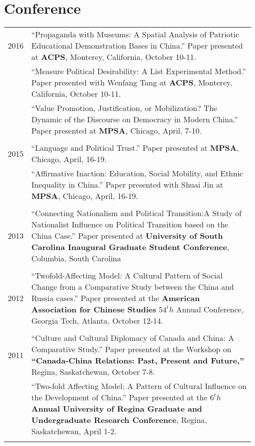 \documentclass[a4paper,10pt]{article} %
\begin{document}
\section{Conference}
	\begin{longtable}{r|p{}}
		2016& ``Propaganda with Museums: A Spatial Analysis of Patriotic Educational Demonstration Bases in China.'' Paper presented at \textbf{ACPS}, Monterey, California, October 10-11.\\
		& ``Measure Political Desirability: A List Experimental Method.'' Paper presented with Wenfang Tang at \textbf{ACPS}, Monterey, California, October 10-11.\\
		& ``Value Promotion, Justification, or Mobilization? The Dynamic of the Discourse on Democracy in Modern China.'' Paper presented at \textbf{MPSA}, Chicago, April, 7-10. \\
		\multicolumn{2}{c}{} \\
			
		2015& ``Language and Political Trust.'' Paper presented at \textbf{MPSA}, Chicago, April, 16-19.\\
			& ``Affirmative Inaction: Education, Social Mobility, and Ethnic Inequality in China.'' Paper presented with Shuai Jin at \textbf{MPSA}, Chicago, April, 16-19. \\
		\multicolumn{2}{c}{} \\
		
		2013& ``Connecting Nationalism and Political Transition:A Study of Nationalist Influence on Political Transition based on the China Case.'' Paper presented at \textbf{University of South Carolina Inaugural Graduate Student Conference}, Columbia, South Carolina\\
		\multicolumn{2}{c}{} \\
		
		2012& ``Twofold-Affecting Model: A Cultural Pattern of Social Change from a Comparative Study between the China and Russia cases.'' Paper presented at the \textbf{American Association for Chinese Studies} $54^th$ Annual Conference, Georgia Tech, Atlanta, October 12-14.\\
		\multicolumn{2}{c}{} \\
		
		2011& ``Culture and Cultural Diplomacy of Canada and China: A Comparative Study.'' Paper presented at the Workshop on \textbf{``Canada-China Relations: Past, Present and Future,''} Regina, Saskatchewan, October 7-8.\\
			& ``Two-fold Affecting Model: A Pattern of Cultural Influence on the Development of China.'' Paper presented at the $6^th$ \textbf{Annual University of Regina Graduate and Undergraduate Research Conference}, Regina, Saskatchewan, April 1-2.\\
		\multicolumn{2}{c}{} \\
			

\end{longtable}
\end{document}

